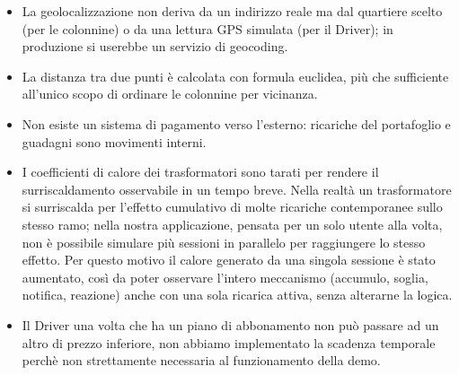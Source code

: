 \begin{itemize}
\item La geolocalizzazione non deriva da un
indirizzo reale ma dal quartiere scelto (per le colonnine) o da una lettura
GPS simulata (per il Driver); in produzione si userebbe un servizio di
geocoding.
\item La distanza tra due punti è calcolata con formula euclidea, più che sufficiente all'unico scopo di ordinare le colonnine per vicinanza.
\item Non esiste un sistema di pagamento verso l'esterno: ricariche del portafoglio e guadagni sono movimenti interni.
\item I coefficienti di calore dei trasformatori sono tarati per rendere il surriscaldamento osservabile in un tempo breve. Nella realtà un trasformatore si surriscalda per l'effetto cumulativo di molte ricariche contemporanee sullo stesso ramo; nella nostra applicazione, pensata per un solo utente alla volta, non è possibile simulare più sessioni in parallelo per raggiungere lo stesso effetto. Per questo motivo il calore generato da una singola sessione è stato aumentato, così da poter osservare l'intero meccanismo (accumulo, soglia, notifica, reazione) anche con una sola ricarica attiva, senza alterarne la logica.
\item Il Driver una volta che ha un piano di abbonamento non può passare ad un altro di prezzo inferiore, non abbiamo implementato la scadenza temporale perchè non strettamente necessaria al funzionamento della demo.
\end{itemize}
